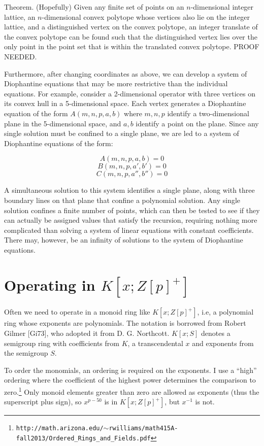 \documentclass{article}
\begin{document}
Theorem.  (Hopefully) Given any finite set of points on an
$n$-dimensional integer lattice, an $n$-dimensional convex polytope
whose vertices also lie on the integer lattice, and a distinguished
vertex on the convex polytope, an integer translate of the convex
polytope can be found such that the distinguished vertex lies
over the only point in the point set that is within the translated
convex polytope.  PROOF NEEDED.

Furthermore, after changing coordinates as above, we can develop a
system of Diophantine equations that may be more restrictive than the
individual equations.  For example, consider a 2-dimensional operator
with three vertices on its convex hull in a 5-dimensional space.  Each
vertex generates a Diophantine equation of the form $A(m,n,p,a,b)$
where $m,n,p$ identify a two-dimensional plane in the 5-dimensional
space, and $a,b$ identify a point on the plane.  Since any single
solution must be confined to a single plane, we are led to a
system of Diophantine equations of the form:

$$A(m,n,p,a,b) = 0$$
$$B(m,n,p,a',b') = 0$$
$$C(m,n,p,a'',b'') = 0$$

A simultaneous solution to this system identifies a single plane,
along with three boundary lines on that plane that confine a
polynomial solution.  Any single solution confines a finite number of
points, which can then be tested to see if they can actually be
assigned values that satisfy the recursion, requiring nothing more
complicated than solving a system of linear equations with constant
coefficients.  There may, however, be an infinity of solutions to the
system of Diophantine equations.



\vfill\eject
\section*{Operating in $K[x; Z[p]^+]$}

Often we need to operate in a monoid ring like $K[x; Z[p]^+]$, i.e, a
polynomial ring whose exponents are polynomials.  The notation is
borrowed from Robert Gilmer [Gi73], who adopted it from
D. G. Northcott.  $K[x; S]$ denotes a semigroup ring with coefficients
from $K$, a transcendental $x$ and exponents from the semigroup $S$.

To order the monomials, an ordering is required on the exponents.  I use a ``high''
ordering where the coefficient of the highest power determines the comparison to zero.\footnote{\tt http://math.arizona.edu/$\sim$rwilliams/math415A-fall2013/Ordered\_Rings\_and\_Fields.pdf}
Only monoid elements greater than zero are allowed as exponents (thus the superscript plus sign),
so $x^{p-50}$ is in $K[x; Z[p]^+]$, but $x^{-1}$ is not.
\end{document}
